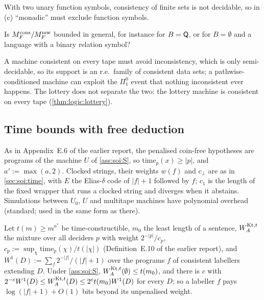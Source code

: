 With two unary function symbols, consistency of finite sets is not decidable, so in (c) ``monadic'' must exclude function symbols.

\begin{question}\label{q:soi:pathwise}
Is $M_{F}^{\mathrm{cons}}/M_{F}^{\mathrm{mw}}$ bounded in general, for instance for $B=\mathsf{Q}$, or for $B=\emptyset$ and a language with a binary relation symbol?
\end{question}

A machine consistent on every tape must avoid inconsistency, which is only semi-decidable, so its support is an r.e.\ family of consistent data sets; a pathwise-conditioned machine can exploit the $\Pi^0_1$ event that nothing inconsistent ever happens. The lottery does not separate the two: the lottery machine is consistent on every tape (\cref{thm:logic:lottery}).

\subsection{Time bounds with free deduction}\label{sec:app:soi:time}

As in Appendix~E.6 of the earlier report, the penalised coin-free hypotheses are programs of the machine $U$ of \cref{ass:soi:S}, so $\mathrm{time}_p(x)\ge\lvert p\rvert$, and $a':=\max(a,2)$. Clocked strings, their weights $w(f)$ and $c_\bot$ are as in \cref{sec:soi:time}, with $E$ the Elias-$\delta$ code of $\lvert f\rvert+1$ followed by $f$; $c_1$ is the length of the fixed wrapper that runs a clocked string and diverges when it abstains. Simulations between $U_0$, $U$ and multitape machines have polynomial overhead (standard; used in the same form as there).

\begin{proposition}\label{prop:soi:kt}
Let $t(m)\ge m^{a^*}$ be time-constructible, $m_0$ the least length of a sentence, $W_{A}^{\mathrm{Kt},t}$ the mixture over all deciders $p$ with weight $2^{-\lvert p\rvert}/c_p$, $c_p:=\sup_\chi\mathrm{time}_p(\chi)/t(\lvert\chi\rvert)$ (Definition~E.10 of the earlier report), and $W^1(D):=\sum_f2^{-\lvert f\rvert}/(\lvert f\rvert+1)$ over the programs $f$ of consistent labellers extending $D$. Under \cref{ass:soi:S}, $W_{A}^{\mathrm{Kt},t}(\emptyset)\le t(m_0)$, and there is $c$ with $2^{-c}W^1(D)\le W_{A}^{\mathrm{Kt},t}(D)\le2^ct(m_0)W^1(D)$ for every $D$; so a labeller $f$ pays $\log(\lvert f\rvert+1)+O(1)$ bits beyond its unpenalised weight.
\end{proposition}

